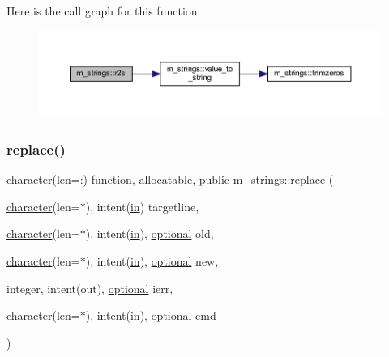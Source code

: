 Here is the call graph for this function\+:
\nopagebreak
\begin{figure}[H]
\begin{center}
\leavevmode
\includegraphics[width=350pt]{namespacem__strings_a5adef1b5667afe21e0ee21cfdba13b45_cgraph}
\end{center}
\end{figure}
\mbox{\label{namespacem__strings_a02d97675e95b9bd0ef3fd2abb9f2f435}} 
\subsubsection{\texorpdfstring{replace()}{replace()}}
{\footnotesize\ttfamily \hyperlink{option__stopwatch_83_8txt_abd4b21fbbd175834027b5224bfe97e66}{character}(len=\+:) function, allocatable, \hyperlink{M__stopwatch_83_8txt_a2f74811300c361e53b430611a7d1769f}{public} m\+\_\+strings\+::replace (\begin{DoxyParamCaption}\item[{\hyperlink{option__stopwatch_83_8txt_abd4b21fbbd175834027b5224bfe97e66}{character}(len=$\ast$), intent(\hyperlink{M__journal_83_8txt_afce72651d1eed785a2132bee863b2f38}{in})}]{targetline,  }\item[{\hyperlink{option__stopwatch_83_8txt_abd4b21fbbd175834027b5224bfe97e66}{character}(len=$\ast$), intent(\hyperlink{M__journal_83_8txt_afce72651d1eed785a2132bee863b2f38}{in}), \hyperlink{option__stopwatch_83_8txt_aa4ece75e7acf58a4843f70fe18c3ade5}{optional}}]{old,  }\item[{\hyperlink{option__stopwatch_83_8txt_abd4b21fbbd175834027b5224bfe97e66}{character}(len=$\ast$), intent(\hyperlink{M__journal_83_8txt_afce72651d1eed785a2132bee863b2f38}{in}), \hyperlink{option__stopwatch_83_8txt_aa4ece75e7acf58a4843f70fe18c3ade5}{optional}}]{new,  }\item[{integer, intent(out), \hyperlink{option__stopwatch_83_8txt_aa4ece75e7acf58a4843f70fe18c3ade5}{optional}}]{ierr,  }\item[{\hyperlink{option__stopwatch_83_8txt_abd4b21fbbd175834027b5224bfe97e66}{character}(len=$\ast$), intent(\hyperlink{M__journal_83_8txt_afce72651d1eed785a2132bee863b2f38}{in}), \hyperlink{option__stopwatch_83_8txt_aa4ece75e7acf58a4843f70fe18c3ade5}{optional}}]{cmd }\end{DoxyParamCaption})}



